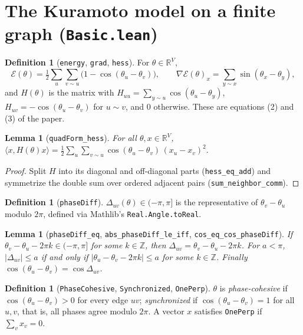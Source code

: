 \documentclass[11pt]{amsart}
\newcommand{\leanname}[1]{\texttt{\textcolor{black!75}{#1}}}
\newcommand{\lfile}[1]{\texttt{#1}}
\newcommand{\E}{\mathcal{E}}
\newcommand{\R}{\mathbb{R}}
\newcommand{\Z}{\mathbb{Z}}
\theoremstyle{plain}
\newtheorem{lemma}[theorem]{Lemma}
\theoremstyle{definition}
\newtheorem{definition}[theorem]{Definition}
\theoremstyle{remark}
\begin{document}
\section{The Kuramoto model on a finite graph (\lfile{Basic.lean})}

\begin{definition}[\leanname{energy}, \leanname{grad}, \leanname{hess}]
For $\theta\in\R^V$,
\[
\E(\theta)=\tfrac12\sum_{u}\sum_{v\sim u}\bigl(1-\cos(\theta_u-\theta_v)\bigr),\qquad
\nabla\E(\theta)_x=\sum_{y\sim x}\sin(\theta_x-\theta_y),
\]
and $H(\theta)$ is the matrix with $H_{uu}=\sum_{y\sim u}\cos(\theta_u-\theta_y)$,
$H_{uv}=-\cos(\theta_u-\theta_v)$ for $u\sim v$, and $0$ otherwise. These are equations (2)
and (3) of the paper.
\end{definition}

\begin{lemma}[\leanname{quadForm\_hess}]\label{lem:quadform}
For all $\theta,x\in\R^V$,
$\displaystyle \langle x,H(\theta)x\rangle=\tfrac12\sum_u\sum_{v\sim u}\cos(\theta_u-\theta_v)\,(x_u-x_v)^2.$
\end{lemma}
\begin{proof}
Split $H$ into its diagonal and off-diagonal parts (\leanname{hess\_eq\_add}) and symmetrize the
double sum over ordered adjacent pairs (\leanname{sum\_neighbor\_comm}).
\end{proof}

\begin{definition}[\leanname{phaseDiff}]
$\Delta_{uv}(\theta)\in(-\pi,\pi]$ is the representative of $\theta_v-\theta_u$ modulo $2\pi$,
defined via Mathlib's \texttt{Real.Angle.toReal}.
\end{definition}

\begin{lemma}[\leanname{phaseDiff\_eq}, \leanname{abs\_phaseDiff\_le\_iff}, \leanname{cos\_eq\_cos\_phaseDiff}]
If $\theta_v-\theta_u-2\pi k\in(-\pi,\pi]$ for some $k\in\Z$, then
$\Delta_{uv}=\theta_v-\theta_u-2\pi k$. For $a<\pi$,
$|\Delta_{uv}|\le a$ if and only if $|\theta_u-\theta_v-2\pi k|\le a$ for some $k\in\Z$.
Finally $\cos(\theta_u-\theta_v)=\cos\Delta_{uv}$.
\end{lemma}

\begin{definition}[\leanname{PhaseCohesive}, \leanname{Synchronized}, \leanname{OnePerp}]
$\theta$ is \emph{phase-cohesive} if $\cos(\theta_u-\theta_v)>0$ for every edge $uv$;
\emph{synchronized} if $\cos(\theta_u-\theta_v)=1$ for all $u,v$, that is, all phases agree
modulo $2\pi$. A vector $x$ satisfies \leanname{OnePerp} if $\sum_v x_v=0$.
\end{definition}
\end{document}
